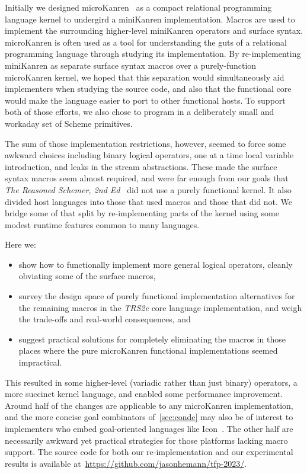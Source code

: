 \documentclass[sigplan,balance=true,pbalance=true,natbib=false]{acmart}
\begin{document}
Initially we designed microKanren~\cite{hemann2013muKanren} as a
compact relational programming language kernel to undergird a
miniKanren implementation. Macros are used to implement the
surrounding higher-level miniKanren operators and surface syntax.\@
microKanren is often used as a tool for understanding the guts of a
relational programming language through studying its implementation.
By re-implementing miniKanren as separate surface syntax macros over a
purely-function microKanren kernel, we hoped that this separation
would simultaneously aid implementers when studying the source code,
and also that the functional core would make the language easier to
port to other functional hosts. To support both of those efforts, we
also chose to program in a deliberately small and workaday set of
Scheme primitives.

The sum of those implementation restrictions, however, seemed to force
some awkward choices including binary logical operators, one at a time
local variable introduction, and leaks in the stream abstractions.
These made the surface syntax macros seem almost required, and were
far enough from our goals that \emph{The Reasoned Schemer, 2nd
  Ed}~\cite{friedman2018reasoned} did not use a purely functional
kernel. It also divided host languages into those that used macros and
those that did not. We bridge some of that split by re-implementing
parts of the kernel using some modest runtime features common to many
languages.

Here we:
%
\begin{itemize}

\item show how to functionally implement more general logical
  operators, cleanly obviating some of the surface macros,

\item survey the design space of purely functional implementation
  alternatives for the remaining macros in the \emph{TRS2e} core
  language implementation, and weigh the trade-offs and real-world
  consequences, and

\item suggest practical solutions for completely eliminating the
  macros in those places where the pure microKanren functional
  implementations seemed impractical.

\end{itemize}

This resulted in some higher-level (variadic rather than just binary)
operators, a more succinct kernel language, and enabled some
performance improvement. Around half of the changes are applicable to
any microKanren implementation, and the more concise goal combinators
of~\cref{sec:conde} may also be of interest to implementers who embed
goal-oriented languages like Icon~\cite{griswold1983icon}. The other
half are necessarily awkward yet practical strategies for those
platforms lacking macro support. The source code for both our
re-implementation and  our experimental results is available
at~\url{https://github.com/jasonhemann/tfp-2023/}.
\end{document}
